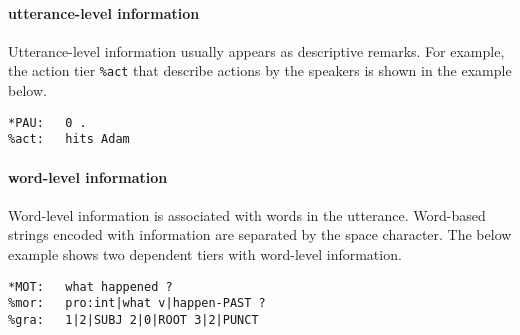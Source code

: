 \paragraph{utterance-level information}
Utterance-level information usually appears as descriptive remarks. For example, the action tier \texttt{\%act} that describe actions by the speakers is shown in the example below.\\

\lstset{
numbers = none,
frame = single,
}

\begin{lstlisting}[caption={Example of a dependent tier with utterance-level information.}, label={lst:chatsent1}]
*PAU:   0 .
%act:   hits Adam
\end{lstlisting}


\paragraph{word-level information}
Word-level information is associated with words in the utterance. Word-based strings encoded with information are separated by the space character. The below example shows two dependent tiers with word-level information.

\clearpage

\lstset{
numbers = none,
frame = single,
}

\begin{lstlisting}[caption={Example of dependent tiers with word-level information}, label={lst:chatsent2}]
*MOT:   what happened ?
%mor:   pro:int|what v|happen-PAST ?
%gra:   1|2|SUBJ 2|0|ROOT 3|2|PUNCT
\end{lstlisting}


